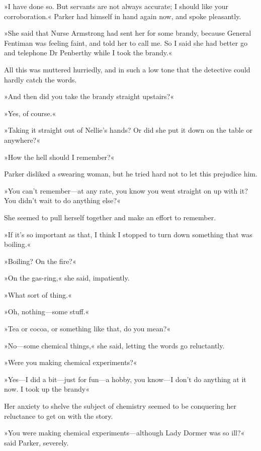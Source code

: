 »I have done so. But servants are not always accurate; I should like your corroboration.« Parker had himself in hand again now, and spoke pleasantly.

»She said that Nurse Armstrong had sent her for some brandy, because General Fentiman was feeling faint, and told her to call me. So I said she had better go and telephone Dr Penberthy while I took the brandy.«

All this was muttered hurriedly, and in such a low tone that the detective could hardly catch the words.

»And then did you take the brandy straight upstairs?«

»Yes, of course.«

»Taking it straight out of Nellie's hands? Or did she put it down on the table or anywhere?«

»How the hell should I remember?«

Parker disliked a swearing woman, but he tried hard not to let this prejudice him.

»You can't remember\allowbreak---\allowbreak at any rate, you know you went straight on up with it? You didn't wait to do anything else?«

She seemed to pull herself together and make an effort to remember.

»If it's so important as that, I think I stopped to turn down something that was boiling.«

»Boiling? On the fire?«

»On the gas-ring,« she said, impatiently.

»What sort of thing.«

»Oh, nothing\allowbreak---\allowbreak some stuff.«

»Tea or cocoa, or something like that, do you mean?«

»No\allowbreak---\allowbreak some chemical things,« she said, letting the words go reluctantly.

»Were you making chemical experiments?«

»Yes\allowbreak---\allowbreak I did a bit\allowbreak---\allowbreak just for fun\allowbreak---\allowbreak a hobby, you know\allowbreak---\allowbreak I don't do anything at it now. I took up the brandy\longdash«

Her anxiety to shelve the subject of chemistry seemed to be conquering her reluctance to get on with the story.

»You were making chemical experiments\allowbreak---\allowbreak although Lady Dormer was so ill?« said Parker, severely.


